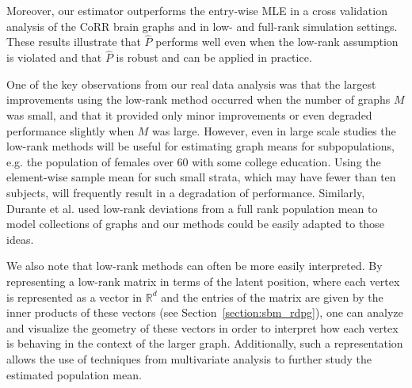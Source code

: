 \documentclass[10pt,letterpaper]{article}
\renewcommand{\Re}{\mathbb{R}}
\renewcommand{\hat}{\widehat}
\begin{document}
Moreover, our estimator outperforms the entry-wise MLE in a cross validation analysis of the CoRR brain graphs and in low- and full-rank simulation settings.
These results illustrate that $\hat{P}$ performs well even when the low-rank assumption is violated and that $\hat{P}$ is robust and can be applied in practice.

One of the key observations from our real data analysis was that the largest improvements using the low-rank method occurred when the number of graphs $M$ was small, and that it provided only minor improvements or even degraded performance slightly when $M$ was large. 
However, even in large scale studies the low-rank methods will be useful for estimating graph means for subpopulations, e.g. the population of females over 60 with some college education.
Using the element-wise sample mean for such small strata, which may have fewer than ten subjects, will frequently result in a degradation of performance.
Similarly, Durante et al. \cite{durante2014nonparametric} used low-rank deviations from a full rank population mean to model collections of graphs and our methods could be easily adapted to those ideas.

We also note that low-rank methods can often be more easily interpreted.
By representing a low-rank matrix in terms of the latent position, where each vertex is represented as a vector in $\Re^d$ and the entries of the matrix are given by the inner products of these vectors (see Section~\ref{section:sbm_rdpg}), one can analyze and visualize the geometry of these vectors in order to interpret how each vertex is behaving in the context of the larger graph. 
Additionally, such a representation allows the use of techniques from multivariate analysis to further study the estimated population mean.




\end{document}

